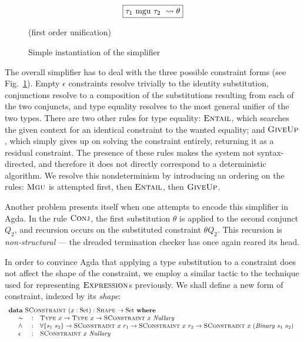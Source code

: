 \documentclass[a4paper]{jfp}
\begin{document}
\begin{figure}
   \begin{displaymath}
      \text{\fbox{$\tau_1\ \text{mgu}\ \tau_2\ \leadsto \theta $}}
   \end{displaymath}
   \begin{center}
      (first order unification)
   \end{center}
   \caption{Simple instantiation of the simplifier}
   \label{fig:simpl}
\end{figure}


The overall simplifier has to deal with the three possible constraint forms (see Fig.~\ref{fig:simpl}). Empty $\epsilon$ constraints resolve trivially
to the identity substitution, conjunctions resolve to a composition of the substitutions resulting from each of the two conjuncts, and type equality
resolves to the most general unifier of the two types. There are two other rules for type equality: $\textsc{Entail}$, which searches the given
context for an identical constraint to the wanted equality; and $\textsc{GiveUp}$, which simply gives up on solving the constraint entirely, returning
it as a residual constraint. The presence of these rules makes the system not syntax-directed, and therefore it does not directly correspond to a
deterministic algorithm. We resolve this nondeterminism by introducing an ordering on the rules: $\textsc{Mgu}$ is attempted first, then
$\textsc{Entail}$, then $\textsc{GiveUp}$. 

Another problem presents itself when one attempts to encode this simplifier in Agda. In the rule $\textsc{Conj}$, the first substitution $\theta$ is
applied to the second conjunct $Q_2$, and recursion occurs on the substituted constraint $\theta Q_2$. This recursion is \emph{non-structural} ---
the dreaded termination checker has once again reared its head.

In order to convince Agda that applying a type substitution to a constraint does not affect the shape of the constraint, we employ a similar tactic to
the technique used for representing $\textsc{Expression}$s previously. We shall define a new form of constraint, indexed by its \emph{shape}:
\begin{displaymath}
   \begin{array}{l}
      \textbf{data}\ \textsc{SConstraint}\ (x : \text{Set}) : \textsc{Shape} \rightarrow \text{Set}\ \textbf{where} \\
      \quad \begin{array}{lll}
      \sim\ & : & \textsc{Type}\ x \rightarrow \textsc{Type}\ x \rightarrow \textsc{SConstraint}\ x\ \mathit{Nullary} \\ 
      \land & : & \forall \{s_1\ s_2\} \rightarrow \textsc{SConstraint}\ x\ r_1 \rightarrow \textsc{SConstraint}\ x\ r_2 
                  \rightarrow \textsc{SConstraint}\ x\ (\mathit{Binary}\ s_1\  s_2) \\
      \epsilon\ & : & \textsc{SConstraint}\ x\ \mathit{Nullary}
      \end{array}
   \end{array}
\end{displaymath}
\end{document}
